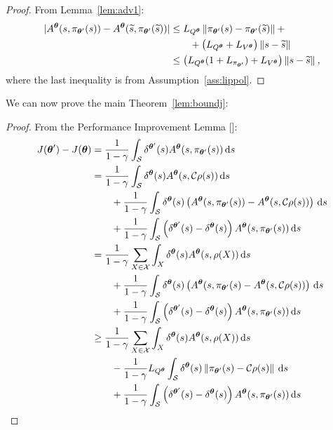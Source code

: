 \begin{proof}
	From Lemma~\ref{lem:adv1}:
	\begin{align}
	|A^{\boldsymbol{\theta}}(s,\pi_{\boldsymbol{\theta}'}(s)) - A^{\boldsymbol{\theta}}(\widetilde{s},\pi_{\boldsymbol{\theta}'}(\widetilde{s}))| 
	&\leq L_{Q^{\boldsymbol{\theta}}}\left\|\pi_{\boldsymbol{\theta}'}(s) - \pi_{\boldsymbol{\theta}'}(\widetilde{s})\right\|_{} + \nonumber\\
	&\qquad+ \left(L_{Q^{\boldsymbol{\theta}}} + L_{V^{\boldsymbol{\theta}}}\right)\left\|s-\widetilde{s}\right\|_{} \nonumber\\
	&\leq \left(L_{Q^{\boldsymbol{\theta}}}(1 + L_{\pi_{\boldsymbol{\theta}'}}) + L_{V^{\boldsymbol{\theta}}}\right)\left\|s-\widetilde{s}\right\|_{},
	\end{align}
	where the last inequality is from Assumption~\ref{ass:lippol}.
\end{proof}
\noindent We can now prove the main Theorem~\ref{lem:boundj}:
\boundj*
\begin{proof}
	From the Performance Improvement Lemma [\cite{kakade2002approximately}]:
	\begin{align}
	J(\vtheta') - J(\vtheta) 
	&=\frac{1}{1-\gamma} \int_{\Sspace}\delta^{\vtheta'}(s)A^{\vtheta}(s,\pi_{\vtheta'}(s))\de s \nonumber \\
	&= \frac{1}{1-\gamma}\int_{\Sspace}\delta^{\vtheta}(s)A^{\vtheta}(s,\Conc\rho(s))\de s \nonumber\\
	&\qquad+ \frac{1}{1-\gamma}\int_{\Sspace}\delta^{\vtheta}(s)\left(A^{\vtheta}(s,\pi_{\vtheta'}(s)) - A^{\vtheta}(s,\Conc\rho(s))\right)\de s
	\nonumber\\
	&\qquad+
	\frac{1}{1-\gamma}\int_{\Sspace}\left(\delta^{\vtheta'}(s) - \delta^{\vtheta}(s)\right)A^{\vtheta}(s,\pi_{\vtheta'}(s))\de s \nonumber\\		
	&= \frac{1}{1-\gamma}\sum_{X\in\Xspace}\int_{X}\delta^{\vtheta}(s)A^{\vtheta}(s,\rho(X))\de s \nonumber\\
	&\qquad+ \frac{1}{1-\gamma}\int_{\Sspace}\delta^{\vtheta}(s)\left(A^{\vtheta}(s,\pi_{\vtheta'}(s) - A^{\vtheta}(s,\Conc\rho(s))\right)\de s
	\nonumber\\
	&\qquad+ \frac{1}{1-\gamma}\int_{\Sspace}\left(\delta^{\vtheta'}(s) - \delta^{\vtheta}(s)\right)A^{\vtheta}(s,\pi_{\vtheta'}(s))\de s \label{p:2}\\
	&\geq  \frac{1}{1-\gamma}\sum_{X\in\Xspace}\int_{X}\delta^{\vtheta}(s)A^{\vtheta}(s,\rho(X))\de s \nonumber\\
	&\qquad	- \frac{1}{1-\gamma}L_{Q^{\vtheta}}\int_{\Sspace}\delta^{\vtheta}(s)\norm{\pi_{\vtheta'}(s) - \Conc\rho(s)} \de s
	\nonumber\\
	&\qquad+ \frac{1}{1-\gamma}\int_{\Sspace}\left(\delta^{\vtheta'}(s) - \delta^{\vtheta}(s)\right)A^{\vtheta}(s,\pi_{\vtheta'}(s))\de s \label{p:3}\\

\end{align}
\end{proof}
